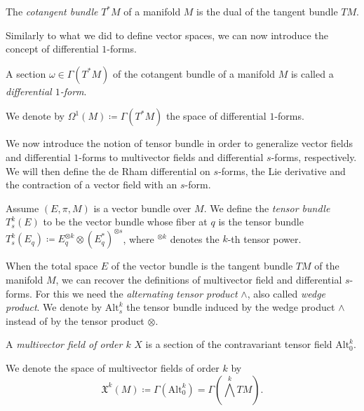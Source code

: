 \begin{definition}
    The \emph{cotangent bundle} $T^*M$ of a manifold $M$ is the dual of the tangent bundle $TM$.
\end{definition}

Similarly to what we did to define vector spaces, we can now introduce the concept of differential $1$-forms.

\begin{definition}
    A section $\omega \in \Gamma(T^*M)$ of the cotangent bundle of a manifold $M$ is called a \emph{differential $1$-form}.
\end{definition}

We denote by $\Omega^1(M) \coloneqq \Gamma(T^*M)$ the space of differential $1$-forms.

We now introduce the notion of tensor bundle in order to generalize vector fields and differential $1$-forms to multivector fields and differential $s$-forms, respectively.
We will then define the de Rham differential on $s$-forms, the Lie derivative and the contraction of a vector field with an $s$-form.

\begin{definition}
    Assume $(E, \pi, M)$ is a vector bundle over $M$.
    We define the \emph{tensor bundle} $T_s ^k (E)$ to be the vector bundle whose fiber at $q$ is the tensor bundle $T_s ^k (E_q) \coloneqq E_q ^{\otimes k} \otimes (E_q ^*) ^{\otimes s}$, where $^{\otimes k}$ denotes the $k$-th tensor power.
\end{definition}

When the total space $E$ of the vector bundle is the tangent bundle $TM$ of the manifold $M$, we can recover the definitions of multivector field and differential $s$-forms.
For this we need the \emph{alternating tensor product} $\wedge$, also called \emph{wedge product}.
We denote by $\text{Alt}_s ^k$ the tensor bundle induced by the wedge product $\wedge$ instead of by the tensor product $\otimes$.

\begin{definition}
    A \emph{multivector field of order $k$} $X$ is a section of the contravariant tensor field $\text{Alt}_0 ^k$.
\end{definition}

We denote the space of multivector fields of order $k$ by
\begin{equation*}
    \mathfrak{X}^k(M) \coloneqq \Gamma(\text{Alt}_0 ^k) = \Gamma \left( \bigwedge ^k TM \right).
\end{equation*}

